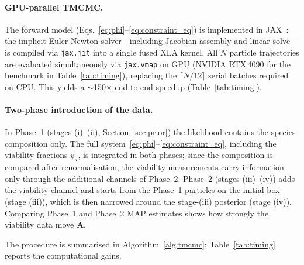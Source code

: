 \documentclass[11pt,a4paper]{article}
\begin{document}
\paragraph{GPU-parallel TMCMC.}
The forward model (Eqs.~\ref{eq:phi}--\ref{eq:constraint_eq}) is implemented in JAX~\cite{jax2018github}: the implicit Euler Newton solver---including Jacobian assembly and linear solve---is compiled via \texttt{jax.jit} into a single fused XLA kernel.
All $N$ particle trajectories are evaluated simultaneously via \texttt{jax.vmap} on GPU (NVIDIA RTX\,4090 for the benchmark in Table~\ref{tab:timing}), replacing the $\lceil N/12\rceil$ serial batches required on CPU.
This yields a $\sim$150$\times$ end-to-end speedup (Table~\ref{tab:timing}).

\paragraph{Two-phase introduction of the data.}
In Phase~1 (stages (i)--(ii), Section~\ref{sec:prior}) the likelihood contains the species composition only.
The full system~\eqref{eq:phi}--\eqref{eq:constraint_eq}, including the viability fractions $\psi_i$, is integrated in both phases; since the composition is compared after renormalisation, the viability measurements carry information only through the additional channels of Phase~2.
Phase~2 (stages (iii)--(iv)) adds the viability channel and starts from the Phase~1 particles on the initial box (stage (iii)), which is then narrowed around the stage-(iii) posterior (stage (iv)).
Comparing Phase~1 and Phase~2 MAP estimates shows how strongly the viability data move $\mathbf{A}$.

The procedure is summarised in Algorithm~\ref{alg:tmcmc}; Table~\ref{tab:timing} reports the computational gains.
\end{document}
